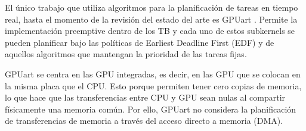 El único trabajo que utiliza algoritmos para la planificación de tareas en tiempo real, hasta el momento de la revisión del estado del arte es GPUart \cite{GPUArt}. 
Permite la implementación preemptive dentro de los TB y cada uno de estos subkernels se pueden planificar bajo las políticas de Earliest Deadline First (EDF) y de aquellos algoritmos que mantengan la prioridad de las tareas fijas.
\newline

GPUart se centra en las GPU integradas, es decir, en las GPU que se colocan en la misma placa que el CPU. Esto porque permiten tener cero copias de memoria, lo que hace que las transferencias entre CPU y GPU sean nulas al compartir físicamente una memoria común. 
Por ello, GPUart no considera la planificación de transferencias de memoria a través del acceso directo a memoria (DMA).
\newline
 	
